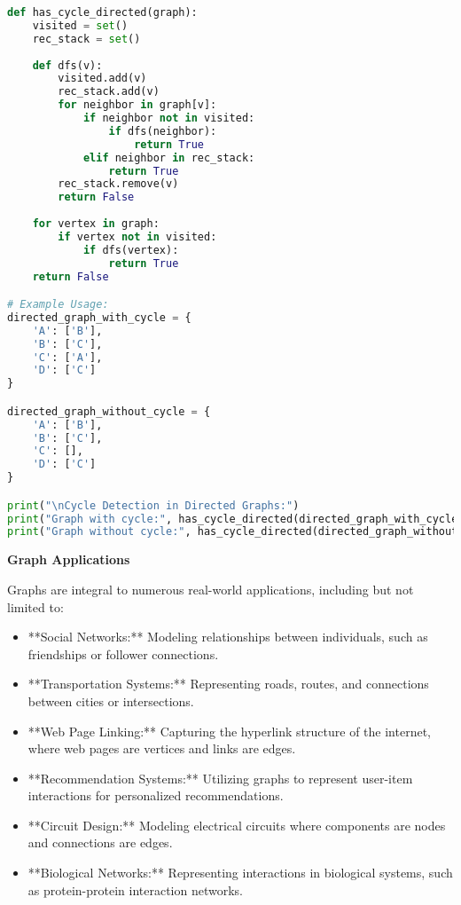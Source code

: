 \begin{lstlisting}[language=Python, xleftmargin=0.02\textwidth, xrightmargin=0.02\textwidth]
def has_cycle_directed(graph):
    visited = set()
    rec_stack = set()
    
    def dfs(v):
        visited.add(v)
        rec_stack.add(v)
        for neighbor in graph[v]:
            if neighbor not in visited:
                if dfs(neighbor):
                    return True
            elif neighbor in rec_stack:
                return True
        rec_stack.remove(v)
        return False
    
    for vertex in graph:
        if vertex not in visited:
            if dfs(vertex):
                return True
    return False

# Example Usage:
directed_graph_with_cycle = {
    'A': ['B'],
    'B': ['C'],
    'C': ['A'],
    'D': ['C']
}

directed_graph_without_cycle = {
    'A': ['B'],
    'B': ['C'],
    'C': [],
    'D': ['C']
}

print("\nCycle Detection in Directed Graphs:")
print("Graph with cycle:", has_cycle_directed(directed_graph_with_cycle))  # Output: True
print("Graph without cycle:", has_cycle_directed(directed_graph_without_cycle))  # Output: False
\end{lstlisting}

\textbf{Graph Applications}

Graphs are integral to numerous real-world applications, including but not limited to:

\begin{itemize}
    \item **Social Networks:** Modeling relationships between individuals, such as friendships or follower connections.
    \item **Transportation Systems:** Representing roads, routes, and connections between cities or intersections.
    \item **Web Page Linking:** Capturing the hyperlink structure of the internet, where web pages are vertices and links are edges.
    \item **Recommendation Systems:** Utilizing graphs to represent user-item interactions for personalized recommendations.
    \item **Circuit Design:** Modeling electrical circuits where components are nodes and connections are edges.
    \item **Biological Networks:** Representing interactions in biological systems, such as protein-protein interaction networks.
\end{itemize}

